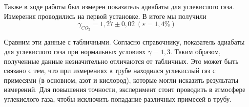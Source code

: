 \documentclass[a4paper,12pt]{article}
\theoremstyle{definition}
\begin{document}
	Также в ходе работы был измерен показатель адиабаты для углекислого газа. Измерения проводились на первой установке. В итоге мы получили \[ {\gamma_{CO_2} = 1,27 \pm 0,02}\ (\varepsilon=1,4\%) \]
	
	Сравним эти данные с табличными. Согласно справочнику, показатель адиабаты для углекислого газа при нормальных условиях $ \gamma = 1,3 $. Таким образом, полученные данные незначительно отличаются от табличных. Это может быть связано с тем, что при измерениях в трубе находился углекислый газ с примесями (в основном, азот и кислород), которые могли исказить результаты измерений. Для повышения точности, эксперимент стоит проводить в атмосфере углекислого газа, чтобы исключить попадание различных примесей в трубу.
	
	
	
	
	
	
\end{document}
